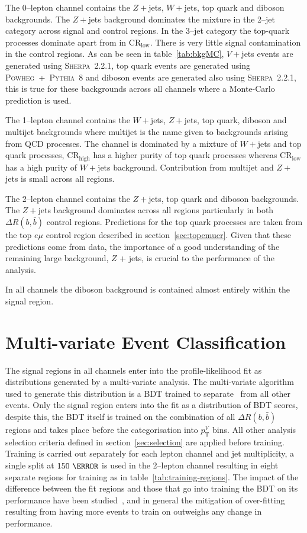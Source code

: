 The 0--lepton channel contains the  $Z + $jets, $W+$jets, top quark and
diboson backgrounds. The $Z+$jets background dominates the mixture in the
2--jet category across signal and control regions. In the 3--jet category the
top-quark processes dominate apart from in CR$_{\text{low}}$. There is very little signal
contamination in the control regions. As can be seen in table~\ref{tab:bkgMC},
$V+$jets events are generated using \textsc{Sherpa~2.2.1}, top quark events
are generated using \textsc{Powheg}~+~\textsc{Pythia~8} and diboson events are
generated also using \textsc{Sherpa~2.2.1}, this is true for these backgrounds
across all channels where a Monte-Carlo prediction is used.


The 1--lepton channel contains the $W+$jets, $Z+$jets, top quark, diboson
and multijet backgrounds where multijet is the name given to backgrounds arising
from QCD processes. The channel is dominated by a mixture of $W+$jets and top
quark processes, CR$_{\text{high}}$ has a higher purity of top quark processes whereas CR$_{\text{low}}$
has a high purity of $W+$jets background. Contribution from multijet and
$Z+$jets is small across all regions.

The 2--lepton channel contains the $Z+$jets, top quark and diboson
backgrounds. The $Z+$jets background dominates across all regions particularly
in both $\Delta R(b, \bar{b})$ control regions. Predictions for the top quark
processes are taken from the top $e \mu$ control region described in
section~\ref{sec:topemucr}. Given that these predictions come from data, the
importance of a good understanding of the remaining large background, $Z$ +
jets, is crucial to the performance of the analysis.

In all channels the diboson background is contained almost entirely within the
signal region.

\section{Multi-variate Event Classification}%
\label{sec:mva}

The signal regions in all channels enter into the profile-likelihood fit as
distributions generated by a multi-variate analysis. The multi-variate algorithm
used to generate this distribution is a BDT trained to separate \VHbb\ from all
other events. Only the signal region enters into the fit as a distribution of
BDT scores, despite this, the BDT itself is trained on the combination of all
$\Delta R(b, \bar{b})$ regions and takes place before the categorisation into
$p_{\mathrm{T}}^V$ bins. All other analysis selection criteria defined in
section~\ref{sec:selection} are applied before training. Training is carried out
separately for each lepton channel and jet multiplicity, a single split at
$150~\GeV$ is used in the 2--lepton channel resulting in eight separate regions
for training as in table~\ref{tab:training-regions}. The impact of the
difference between the fit regions and those that go into training the BDT on
its performance have been studied~\cite{VHMainNote2019}, and in general the
mitigation of over-fitting resulting from having more events to train on
outweighs any change in performance.


